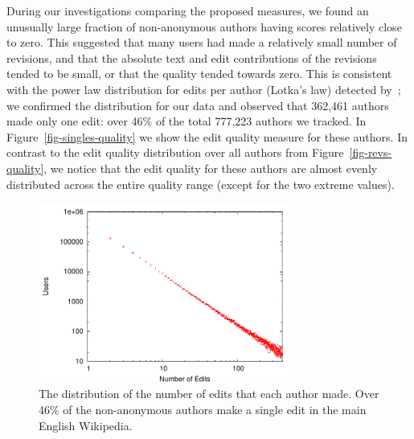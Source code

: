 During our investigations comparing the proposed measures,
we found an unusually large fraction of non-anonymous authors
having scores relatively close to zero.
This suggested that many users had made a relatively
small number of revisions, and that the absolute
text and edit contributions of the revisions tended to
be small, or that the quality tended towards zero.
This is consistent with the power law distribution
for edits per author (Lotka's law) detected by~\cite{Voss2005};
we confirmed the distribution for our data and observed
that 362,461 authors made only one edit:
over 46\% of the total 777,223 authors we tracked.
In Figure~\ref{fig-singles-quality} we show the edit quality
measure for these authors.
In contrast to the edit quality distribution over
all authors from Figure~\ref{fig-revs-quality},
we notice that the edit quality for these authors
are almost evenly distributed across the
entire quality range (except for the two extreme values).
%
\begin{figure}[tbhp]
    \begin{center}
    \includegraphics[width=0.75\textwidth]{part-I10-contrib/graphs/plot-hist-numedits}
    \end{center}
    \caption[Distribution of authors over number of edits]{
    	The distribution of the number of edits that each author made.
	Over 46\% of the non-anonymous authors
	make a single edit in the main English Wikipedia.
    }
    \label{fig-hist-numedits}
\end{figure}
%
